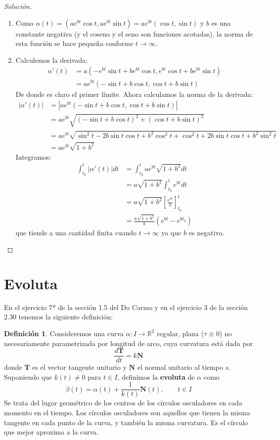\documentclass[spanish]{book}
\theoremstyle{definition}
\newtheorem*{defn}{Definición}
\newcommand{\R}{\mathbb{R}}
\begin{document}
\begin{proof}[Solución]\leavevmode
	\begin{enumerate}
		\item Como $\alpha(t)=(ae^{bt}\cos{t}, ae^{bt}\sin{t})=ae^{bt}(\cos{t},\sin{t})$ y $b$ es una constante negativa (y el coseno  y el seno son funciones acotadas), la norma de esta función se hace pequeña conforme $t\to\infty$.
		\item Calculemos la derivada:
		\begin{align*}
			\alpha'(t)&=a(-e^{bt}\sin{t}+be^{bt}\cos{t},e^{bt}\cos{t}+be^{bt}\sin{t})\\
			&=ae^{bt}(-\sin{t}+b\cos{t},\cos{t}+b\sin{t})
		\end{align*}
		De donde es claro el primer límite. Ahora calculamos la norma de la derivada:
		\begin{align*}
			|\alpha'(t)|&=| ae^{bt}(-\sin{t}+b\cos{t},\cos{t}+b\sin{t})|\\
			&=ae^{bt}\sqrt{(-\sin{t}+b\cos{t})^2+(\cos{t}+b\sin{t})^2}\\
			&=ae^{bt}\sqrt{\sin^2{t}-2b\sin{t}\cos{t}+b^2\cos^2{t}+\cos^2{t}+2b\sin{t}\cos{t}+b^2\sin^2{t}}\\
			&=ae^{bt}\sqrt{1+b^2}
		\end{align*}
		Integramos:
		\begin{align*}
			\int_{t_0}^t|\alpha'(t)| dt&=\int_{t_0}^t ae^{bt}\sqrt{1+b^2}dt\\
			&=a\sqrt{1+b^2}\int_{t_0}^te^{bt}dt\\
			&=a\sqrt{1+b^2}\left[\frac{e^{bt}}{b}\right]_{t_0}^t\\
			&=\frac{a\sqrt{1+b^2}}{b}(e^{bt}-e^{bt_0})
		\end{align*}
		que tiende a una cantidad finita cuando $t\to\infty$ ya que $b$ es negativo.
	\end{enumerate}
\end{proof}

\section{Evoluta}
En el ejercicio 7* de la sección 1.5 del Do Carmo y en el ejercicio 3 de la sección 2.30 tenemos la siguiente definición:
\begin{defn}
	Consideremos una curva $\alpha:I\to\R^2$ regular, plana ($\tau\equiv0$) no necesariamente parametrizada por 		longitud de arco, cuya curvatura está dada por
	\[\frac{d\mathbf{T}}{dt}=k\mathbf{N}\]
	donde $\mathbf{T}$ es el vector tangente unitario y $\mathbf{N}$ el normal unitario al tiempo $s$. Suponiendo que $k(t)\neq0$ 		para $t\in I$, definimos la \textbf{evoluta} de $\alpha$ como
	\[\beta(t)=\alpha(t)+\frac{1}{k(t)}\mathbf{N}(t),\qquad t\in I\]
	Se trata del lugar geométrico de los centros de los círculos osculadores en cada momento en el tiempo. Los círculos osculadores son aquellos que tienen la misma tangente en cada punto de la curva, y también la misma curvatura. Es el círculo que mejor aproxima a la curva.
\end{defn}
\end{document}
